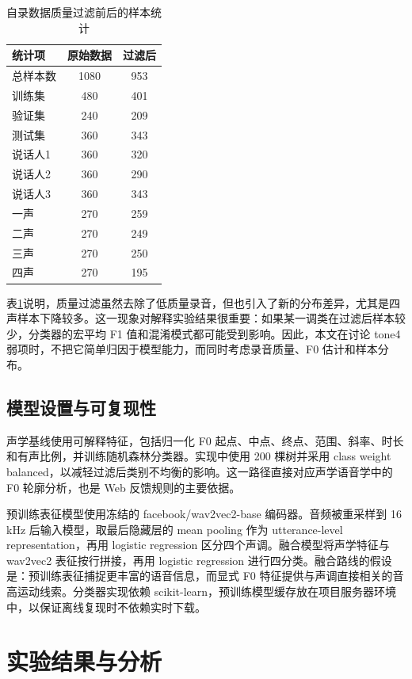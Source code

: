 \documentclass[UTF8,a4paper,twocolumn]{ctexart}
\begin{document}
\begin{table}[t]
\centering
\caption{自录数据质量过滤前后的样本统计}
\label{tab:data-counts}
\begin{tabular}{lcc}
\toprule
统计项 & 原始数据 & 过滤后 \\
\midrule
总样本数 & 1080 & 953 \\
训练集 & 480 & 401 \\
验证集 & 240 & 209 \\
测试集 & 360 & 343 \\
说话人1 & 360 & 320 \\
说话人2 & 360 & 290 \\
说话人3 & 360 & 343 \\
一声 & 270 & 259 \\
二声 & 270 & 249 \\
三声 & 270 & 250 \\
四声 & 270 & 195 \\
\bottomrule
\end{tabular}
\end{table}

表\ref{tab:data-counts}说明，质量过滤虽然去除了低质量录音，但也引入了新的分布差异，尤其是四声样本下降较多。这一现象对解释实验结果很重要：如果某一调类在过滤后样本较少，分类器的宏平均 F1 值和混淆模式都可能受到影响。因此，本文在讨论 tone4 弱项时，不把它简单归因于模型能力，而同时考虑录音质量、F0 估计和样本分布。

\subsection{模型设置与可复现性}

声学基线使用可解释特征，包括归一化 F0 起点、中点、终点、范围、斜率、时长和有声比例，并训练随机森林分类器。实现中使用 200 棵树并采用 class weight balanced，以减轻过滤后类别不均衡的影响。这一路径直接对应声学语音学中的 F0 轮廓分析，也是 Web 反馈规则的主要依据。

预训练表征模型使用冻结的 facebook/wav2vec2-base 编码器。音频被重采样到 16 kHz 后输入模型，取最后隐藏层的 mean pooling 作为 utterance-level representation，再用 logistic regression 区分四个声调。融合模型将声学特征与 wav2vec2 表征按行拼接，再用 logistic regression 进行四分类。融合路线的假设是：预训练表征捕捉更丰富的语音信息，而显式 F0 特征提供与声调直接相关的音高运动线索。分类器实现依赖 scikit-learn\cite{sklearn}，预训练模型缓存放在项目服务器环境中，以保证离线复现时不依赖实时下载。

\section{实验结果与分析}
\end{document}
